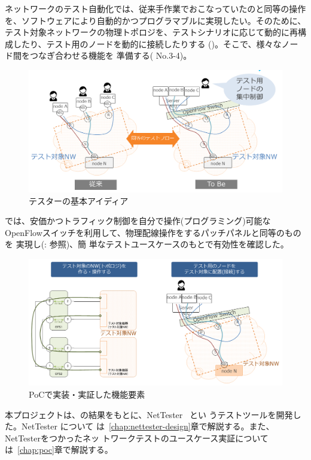 ネットワークのテスト自動化では、従来手作業でおこなっていたのと同等の操作
を、ソフトウェアにより自動的かつプログラマブルに実現したい。そのために、
テスト対象ネットワークの物理トポロジを、テストシナリオに応じて動的に再構
成したり、テスト用のノードを動的に接続したりする
()。そこで、様々なノード間をつなぎ合わせる機能を
準備する( No.3-4)。

\begin{figure}[h]
 \centering
 \includegraphics[scale=0.5]{img/basic-idea.png}
 \caption{テスターの基本アイディア}
 \label{fig:basic-idea}
\end{figure}

\lopjc では、安価かつトラフィック制御を自分で操作(プログラミング)可能な
OpenFlowスイッチを利用して、物理配線操作をするパッチパネルと同等のものを
実現し(: 参照)、簡
単なテストユースケースのもとで有効性を確認した。

\begin{figure}[h]
 \centering
 \includegraphics[scale=0.5]{img/poc-l1patchpj.png}
 \caption{\lopj PoCで実装・実証した機能要素}
 \label{fig:poc-l1patchpj}
\end{figure}



 本プロジェクトは、\lopj の結果をもとに、NetTester~\cite{nettester} とい
 うテストツールを開発した。NetTester について
 は~\ref{chap:nettester-design}章で解説する。また、NetTesterをつかったネッ
 トワークテストのユースケース実証については~\ref{chap:poc}章で解説する。


